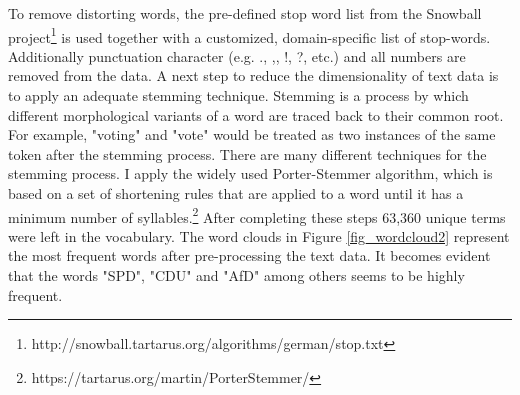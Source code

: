 \documentclass[12pt,a4paper,notitlepage]{article}
\begin{document}
To remove distorting words, the pre-defined stop word list from the Snowball project\footnote{http://snowball.tartarus.org/algorithms/german/stop.txt} is used together with a customized, domain-specific list of stop-words. Additionally punctuation character (e.g. ., ,, !, ?, etc.) and all numbers are removed from the data. A next step to reduce the dimensionality of text data is to apply an adequate stemming technique. Stemming is a process by which different morphological variants of a word are traced back to their common root. For example, "voting" and "vote" would be treated as two instances of the same token after the stemming process. There are many different techniques for the stemming process. I apply the widely used Porter-Stemmer algorithm, which is based on a set of shortening rules that are applied to a word until it has a minimum number of syllables.\footnote{https://tartarus.org/martin/PorterStemmer/} After completing these steps 63,360 unique terms were left in the vocabulary. The word clouds in Figure \ref{fig_wordcloud2} represent the most frequent words after pre-processing the text data. It becomes evident that the words "SPD", "CDU" and "AfD" among others seems to be highly frequent.  
\end{document}
